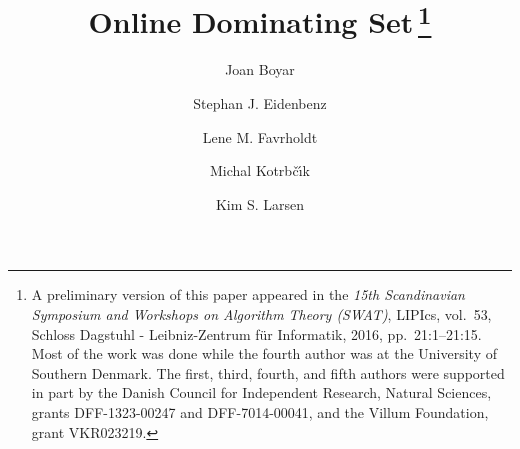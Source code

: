 \newcommand{\ds}{\textrm{DS}\xspace}
\newcommand{\cds}{\textrm{CDS}\xspace}
\newcommand{\tds}{\textrm{TDS}\xspace}
\newcommand{\ids}{\textrm{IDS}\xspace}

\newcommand{\SET}[1]{\ensuremath{\left\{#1\right\}}\xspace}
\newcommand{\SETOF}[2]{\left\{#1\mid#2\right\}\xspace}
\newcommand{\EDGE}[2]{\SET{#1,#2}\xspace}
\newcommand{\CEIL}[1]{\lceil #1\rceil}

\newcommand{\intern}{\operatorname{int}}
\newcommand{\cc}{\mathrm{c}}
\newcommand{\incr}{incremental\xspace}

\renewcommand{\arraystretch}{1.3}



\title{Online Dominating Set\,\thanks{A preliminary version of this paper
appeared in the \emph{15th Scandinavian Symposium and Workshops on Algorithm Theory (SWAT)}, LIPIcs, vol.\ 53, Schloss Dagstuhl - Leibniz-Zentrum f\"{u}r Informatik, 2016, pp.~21:1--21:15. Most of the work was done while the fourth author was at the University of Southern Denmark.
The first, third, fourth, and fifth authors were supported in part by the
Danish Council for Independent Research, Natural Sciences,
grants DFF-1323-00247 and DFF-7014-00041,
and the Villum Foundation, grant VKR023219.}}



\author{Joan Boyar \and Stephan J. Eidenbenz \and
Lene M. Favrholdt \and Michal Kotrb\v{c}\'{\i}k \and Kim S. Larsen}



